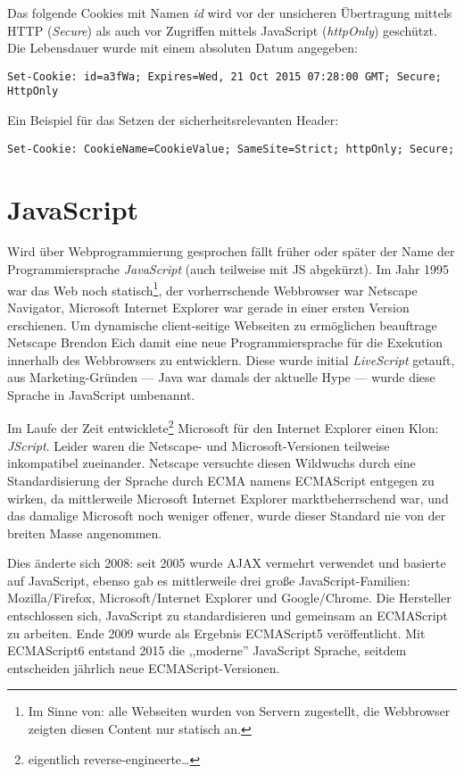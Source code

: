 Das folgende Cookies mit Namen \textit{id} wird vor der unsicheren Übertragung mittels HTTP (\textit{Secure}) als auch vor Zugriffen mittels JavaScript (\textit{httpOnly}) geschützt. Die Lebensdauer wurde mit einem absoluten Datum angegeben:

\begin{verbatim}
Set-Cookie: id=a3fWa; Expires=Wed, 21 Oct 2015 07:28:00 GMT; Secure; HttpOnly
\end{verbatim}

Ein Beispiel für das Setzen der sicherheitsrelevanten Header:

\begin{verbatim}
Set-Cookie: CookieName=CookieValue; SameSite=Strict; httpOnly; Secure;
\end{verbatim}

\section{JavaScript}

Wird über Webprogrammierung gesprochen fällt früher oder später der Name der Programmiersprache \textit{JavaScript} (auch teilweise mit JS abgekürzt). Im Jahr 1995 war das Web noch statisch\footnote{Im Sinne von: alle Webseiten wurden von Servern zugestellt, die Webbrowser zeigten diesen Content nur statisch an.}, der vorherrschende Webbrowser war Netscape Navigator, Microsoft Internet Explorer war gerade in einer ersten Version erschienen. Um dynamische client-seitige Webseiten zu ermöglichen beauftrage Netscape Brendon Eich damit eine neue Programmiersprache für die Exekution innerhalb des Webbrowsers zu entwicklern. Diese wurde initial \textit{LiveScript} getauft, aus Marketing-Gründen --- Java war damals der aktuelle Hype --- wurde diese Sprache in JavaScript umbenannt.

Im Laufe der Zeit entwicklete\footnote{eigentlich reverse-engineerte\ldots} Microsoft für den Internet Explorer einen Klon: \textit{JScript}. Leider waren die Netscape- und Microsoft-Versionen teilweise inkompatibel zueinander. Netscape versuchte diesen Wildwuchs durch eine Standardisierung der Sprache durch ECMA namens ECMAScript entgegen zu wirken, da mittlerweile Microsoft Internet Explorer marktbeherrschend war, und das damalige Microsoft noch weniger offener, wurde dieser Standard nie von der breiten Masse angenommen.

Dies änderte sich 2008: seit 2005 wurde AJAX vermehrt verwendet und basierte auf JavaScript, ebenso gab es mittlerweile drei große JavaScript-Familien: Mozilla/Firefox, Microsoft/Internet Explorer und Google/Chrome. Die Hersteller entschlossen sich, JavaScript zu standardisieren und gemeinsam an ECMAScript zu arbeiten. Ende 2009 wurde als Ergebnis ECMAScript5 veröffentlicht. Mit ECMAScript6 entstand 2015 die ,,moderne'' JavaScript Sprache, seitdem entscheiden jährlich neue ECMAScript-Versionen.

